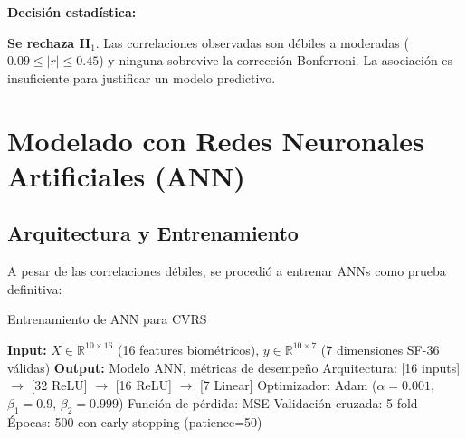 \documentclass[12pt,letterpaper,twoside]{report}
\newcommand{\R}{\mathbb{R}}
\begin{document}
\begin{table}[H]
\centering
\caption{Matriz de Correlación: Biométricos Agregados vs SF-36 ($N=10$)}
\label{tab:correlation_sf36}
\end{table}

\begin{decisionbox}
\textbf{Decisión estadística:}

\textbf{Se rechaza H$_1$}. Las correlaciones observadas son débiles a moderadas ($0.09 \leq |r| \leq 0.45$) y ninguna sobrevive la corrección Bonferroni. La asociación es insuficiente para justificar un modelo predictivo.
\end{decisionbox}

\section{Modelado con Redes Neuronales Artificiales (ANN)}

\subsection{Arquitectura y Entrenamiento}

A pesar de las correlaciones débiles, se procedió a entrenar ANNs como prueba definitiva:

\begin{algorithm}[H]
\caption{Entrenamiento de ANN para CVRS}
\label{alg:ann_training}
\begin{algorithmic}[1]
\State \textbf{Input:} $X \in \R^{10 \times 16}$ (16 features biométricos), $y \in \R^{10 \times 7}$ (7 dimensiones SF-36 válidas)
\State \textbf{Output:} Modelo ANN, métricas de desempeño
\State
\State Arquitectura: [16 inputs] $\to$ [32 ReLU] $\to$ [16 ReLU] $\to$ [7 Linear]
\State Optimizador: Adam ($\alpha=0.001$, $\beta_1=0.9$, $\beta_2=0.999$)
\State Función de pérdida: MSE
\State Validación cruzada: 5-fold
\State Épocas: 500 con early stopping (patience=50)
\end{algorithmic}
\end{algorithm}
\end{document}
